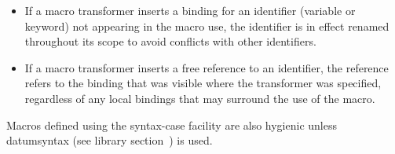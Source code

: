 \begin{itemize}
\item If a macro transformer inserts a binding for an identifier
(variable or keyword) not appearing in the macro use, the identifier is in effect renamed
throughout its scope to avoid conflicts with other identifiers.

\item If a macro transformer inserts a free reference to an
identifier, the reference refers to the binding that was visible
where the transformer was specified, regardless of any local
bindings that may surround the use of the macro.
\end{itemize}

Macros defined using the {\cf syntax-case} facility are also
hygienic unless {\cf datum\coerce{}syntax}
(see library section~) is used.

